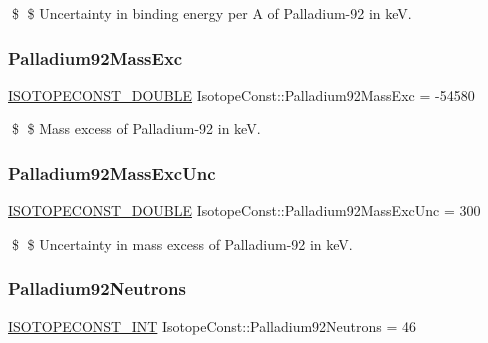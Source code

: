 \$ \$ Uncertainty in binding energy per A of Palladium-\/92 in keV. \mbox{\label{group___isotope_const-_palladium-_pd92_ga0b8b53cf0592b2e39653dc59a17514ae}} 
\subsubsection{\texorpdfstring{Palladium92\+Mass\+Exc}{Palladium92MassExc}}
{\footnotesize\ttfamily \mbox{\hyperlink{group___isotope_const-_macros_ga8f45a7272ce02c0b4c65c44636ed719a}{I\+S\+O\+T\+O\+P\+E\+C\+O\+N\+S\+T\+\_\+\+D\+O\+U\+B\+LE}} Isotope\+Const\+::\+Palladium92\+Mass\+Exc = -\/54580}

\$ \$ Mass excess of Palladium-\/92 in keV. \mbox{\label{group___isotope_const-_palladium-_pd92_gab1cd22af1405cfc456ca9b467b003206}} 
\subsubsection{\texorpdfstring{Palladium92\+Mass\+Exc\+Unc}{Palladium92MassExcUnc}}
{\footnotesize\ttfamily \mbox{\hyperlink{group___isotope_const-_macros_ga8f45a7272ce02c0b4c65c44636ed719a}{I\+S\+O\+T\+O\+P\+E\+C\+O\+N\+S\+T\+\_\+\+D\+O\+U\+B\+LE}} Isotope\+Const\+::\+Palladium92\+Mass\+Exc\+Unc = 300}

\$ \$ Uncertainty in mass excess of Palladium-\/92 in keV. \mbox{\label{group___isotope_const-_palladium-_pd92_gacc14bc4fcd8f27edeb5283d509352aa4}} 
\subsubsection{\texorpdfstring{Palladium92\+Neutrons}{Palladium92Neutrons}}
{\footnotesize\ttfamily \mbox{\hyperlink{group___isotope_const-_macros_ga5f18360b3e99483a35c32d789e62621c}{I\+S\+O\+T\+O\+P\+E\+C\+O\+N\+S\+T\+\_\+\+I\+NT}} Isotope\+Const\+::\+Palladium92\+Neutrons = 46}

